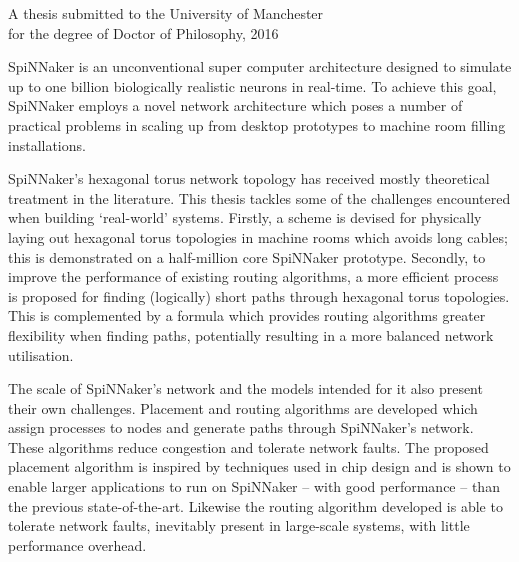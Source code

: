 {
	
	
	
	\vfill
	
	\begin{center}
		\textsc{\large\thesistitle}
		
		\vspace{0.5em}
		
		\thesisauthor
		
		\vspace{0.5em}
		
		A thesis submitted to the University of Manchester\\
		for the degree of Doctor of Philosophy, 2016
	\end{center}
	
	\vfill
	
	
	SpiNNaker is an unconventional super computer architecture designed to
	simulate up to one billion biologically realistic neurons in real-time. To
	achieve this goal, SpiNNaker employs a novel network architecture which poses
	a number of practical problems in scaling up from desktop prototypes to
	machine room filling installations.
	
	SpiNNaker's hexagonal torus network topology has received mostly theoretical
	treatment in the literature. This thesis tackles some of the challenges
	encountered when building `real-world' systems.  Firstly, a scheme is devised
	for physically laying out hexagonal torus topologies in machine rooms which
	avoids long cables; this is demonstrated on a half-million core SpiNNaker
	prototype.  Secondly, to improve the performance of existing routing
	algorithms, a more efficient process is proposed for finding (logically)
	short paths through hexagonal torus topologies. This is complemented by a
	formula which provides routing algorithms greater flexibility when finding
	paths, potentially resulting in a more balanced network utilisation.
	
	The scale of SpiNNaker's network and the models intended for it also present
	their own challenges. Placement and routing algorithms are developed which
	assign processes to nodes and generate paths through SpiNNaker's network.
	These algorithms reduce congestion and tolerate network faults. The proposed
	placement algorithm is inspired by techniques used in chip design and is
	shown to enable larger applications to run on SpiNNaker -- with good
	performance -- than the previous state-of-the-art. Likewise the routing
	algorithm developed is able to tolerate network faults, inevitably present in
	large-scale systems, with little performance overhead.
	
	
	\par%
}
